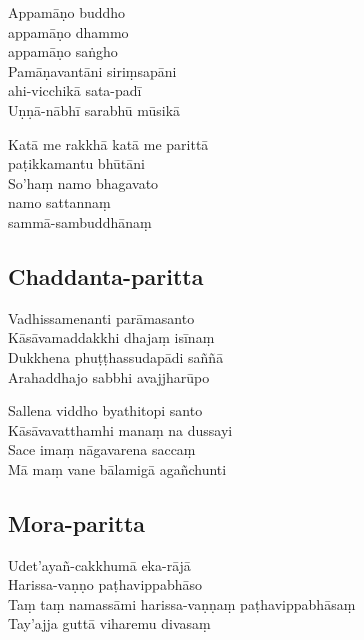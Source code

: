 Appamāṇo buddho\\\vin appamāṇo dhammo\\\vin appamāṇo saṅgho\\
Pamāṇavantāni siriṃsapāni\\\vin ahi-vicchikā sata-padī\\
Uṇṇā-nābhī sarabhū mūsikā

Katā me rakkhā katā me parittā\\\vin paṭikkamantu bhūtāni\\
So'haṃ namo bhagavato\\\vin namo sattannaṃ\\\vin sammā-sambuddhānaṃ


\subsection{Chaddanta-paritta}
\label{vadhissamenanti}



\begin{paritta}

Vadhissamenanti parāmasanto\\
Kāsāvamaddakkhi dhajaṃ isīnaṃ\\
Dukkhena phuṭṭhassudapādi saññā\\
Arahaddhajo sabbhi avajjharūpo

Sallena viddho byathitopi santo\\
Kāsāvavatthamhi manaṃ na dussayi\\
Sace imaṃ nāgavarena saccaṃ\\
Mā maṃ vane bālamigā agañchunti
\end{paritta}


\subsection{Mora-paritta}
\label{udetayan-cakkhuma}



Udet'ayañ-cakkhumā eka-rājā\\
Harissa-vaṇṇo paṭhavippabhāso\\
Taṃ taṃ namassāmi harissa-vaṇṇaṃ paṭhavippabhāsaṃ\\
Tay'ajja guttā viharemu divasaṃ

